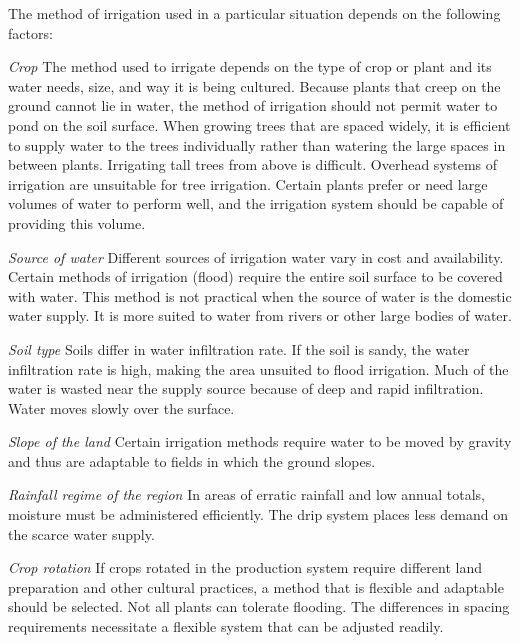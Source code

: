 \documentclass[
]{article}
\begin{document}
The method of irrigation used in a particular situation depends on the following factors:

\emph{Crop}
\newline The method used to irrigate depends on the type of crop or plant and its water needs, size, and way it is being cultured. Because plants that creep on the ground cannot lie in water, the method of irrigation should not permit water to pond on the soil surface. When growing trees that are spaced widely, it is efficient to supply water to the trees individually rather than watering the large spaces in between plants. Irrigating tall trees from above is difficult. Overhead systems of irrigation are unsuitable for tree irrigation. Certain plants prefer or need large volumes of water to perform well, and the irrigation system should be capable of providing this volume.

\emph{Source of water}
\newline Different sources of irrigation water vary in cost and availability. Certain methods of irrigation (flood) require the entire soil surface to be covered with water. This method is not practical when the source of water is the domestic water supply. It is more suited to water from rivers or other large bodies of water.

\emph{Soil type}
\newline Soils differ in water infiltration rate. If the soil is sandy, the water infiltration rate is high, making the area unsuited to flood irrigation. Much of the water is wasted near the supply source because of deep and rapid infiltration. Water moves slowly over the surface.

\emph{Slope of the land}
\newline Certain irrigation methods require water to be moved by gravity and thus are adaptable to fields in which the ground slopes.

\emph{Rainfall regime of the region}
\newline In areas of erratic rainfall and low annual totals, moisture must be administered efficiently. The drip system places less demand on the scarce water supply.

\emph{Crop rotation}
\newline If crops rotated in the production system require different land preparation and other cultural practices, a method that is flexible and adaptable should be selected. Not all plants can tolerate flooding. The differences in spacing requirements necessitate a flexible system that can be adjusted readily.
\end{document}
